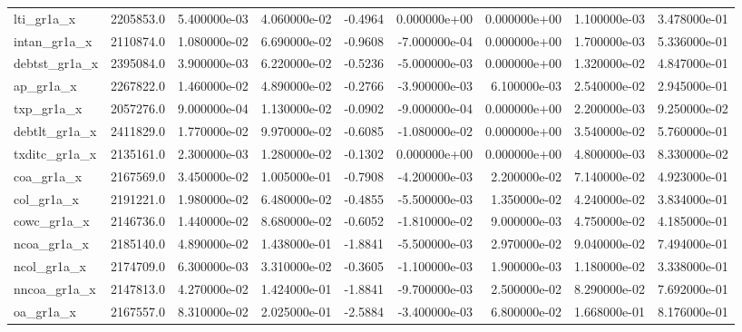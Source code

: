 \documentclass[10pt]{article}
\begin{document}
\begin{landscape}
\begin{longtable}{|l|r|r|r|r|r|r|r|r|}
lti\_gr1a\_x              &  2205853.0 &  5.400000e-03 &  4.060000e-02 &     -0.4964 &  0.000000e+00 &  0.000000e+00 &  1.100000e-03 &  3.478000e-01 \\
intan\_gr1a\_x            &  2110874.0 &  1.080000e-02 &  6.690000e-02 &     -0.9608 & -7.000000e-04 &  0.000000e+00 &  1.700000e-03 &  5.336000e-01 \\
debtst\_gr1a\_x           &  2395084.0 &  3.900000e-03 &  6.220000e-02 &     -0.5236 & -5.000000e-03 &  0.000000e+00 &  1.320000e-02 &  4.847000e-01 \\
ap\_gr1a\_x               &  2267822.0 &  1.460000e-02 &  4.890000e-02 &     -0.2766 & -3.900000e-03 &  6.100000e-03 &  2.540000e-02 &  2.945000e-01 \\
txp\_gr1a\_x              &  2057276.0 &  9.000000e-04 &  1.130000e-02 &     -0.0902 & -9.000000e-04 &  0.000000e+00 &  2.200000e-03 &  9.250000e-02 \\
debtlt\_gr1a\_x           &  2411829.0 &  1.770000e-02 &  9.970000e-02 &     -0.6085 & -1.080000e-02 &  0.000000e+00 &  3.540000e-02 &  5.760000e-01 \\
txditc\_gr1a\_x           &  2135161.0 &  2.300000e-03 &  1.280000e-02 &     -0.1302 &  0.000000e+00 &  0.000000e+00 &  4.800000e-03 &  8.330000e-02 \\
coa\_gr1a\_x              &  2167569.0 &  3.450000e-02 &  1.005000e-01 &     -0.7908 & -4.200000e-03 &  2.200000e-02 &  7.140000e-02 &  4.923000e-01 \\
col\_gr1a\_x              &  2191221.0 &  1.980000e-02 &  6.480000e-02 &     -0.4855 & -5.500000e-03 &  1.350000e-02 &  4.240000e-02 &  3.834000e-01 \\
cowc\_gr1a\_x             &  2146736.0 &  1.440000e-02 &  8.680000e-02 &     -0.6052 & -1.810000e-02 &  9.000000e-03 &  4.750000e-02 &  4.185000e-01 \\
ncoa\_gr1a\_x             &  2185140.0 &  4.890000e-02 &  1.438000e-01 &     -1.8841 & -5.500000e-03 &  2.970000e-02 &  9.040000e-02 &  7.494000e-01 \\
ncol\_gr1a\_x             &  2174709.0 &  6.300000e-03 &  3.310000e-02 &     -0.3605 & -1.100000e-03 &  1.900000e-03 &  1.180000e-02 &  3.338000e-01 \\
nncoa\_gr1a\_x            &  2147813.0 &  4.270000e-02 &  1.424000e-01 &     -1.8841 & -9.700000e-03 &  2.500000e-02 &  8.290000e-02 &  7.692000e-01 \\
oa\_gr1a\_x               &  2167557.0 &  8.310000e-02 &  2.025000e-01 &     -2.5884 & -3.400000e-03 &  6.800000e-02 &  1.668000e-01 &  8.176000e-01 \\

\end{longtable}
\end{landscape}
\end{document}
